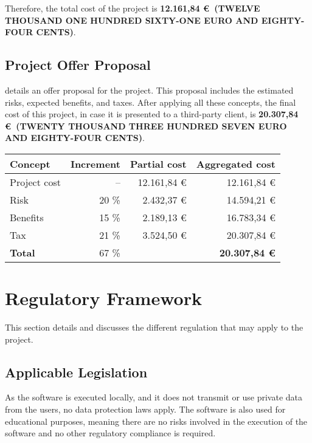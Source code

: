 Therefore, the total cost of the project is \textbf{12.161,84 \euro~(TWELVE THOUSAND ONE HUNDRED SIXTY-ONE EURO AND EIGHTY-FOUR CENTS)}.


\subsection{Project Offer Proposal}\label{subsec:offer-proposal}
 details an offer proposal for the project. This proposal includes the estimated risks, expected benefits, and taxes. After applying all these concepts, the final cost of this project, in case it is presented to a third-party client, is \textbf{20.307,84 \euro~(TWENTY THOUSAND THREE HUNDRED SEVEN EURO AND EIGHTY-FOUR CENTS)}.

\begin{table}[htb]
    {
      \begin{tabular}{lrrr}
        \toprule
        \textbf{Concept} & \textbf{Increment} & \textbf{Partial cost} & \textbf{Aggregated cost} \\
        \midrule
        Project cost   & --    & 12.161,84 \euro & 12.161,84 \euro \\
        Risk           & 20 \% &  2.432,37 \euro & 14.594,21 \euro \\
        Benefits       & 15 \% &  2.189,13 \euro & 16.783,34 \euro \\
        Tax            & 21 \% &  3.524,50 \euro & 20.307,84 \euro \\
        \midrule
        \textbf{Total} & 67 \% & & \textbf{20.307,84 \euro} \\
        \bottomrule
      \end{tabular}
    }
\end{table}



\section{Regulatory Framework}\label{sec:regulation}
This section details and discusses the different regulation that may apply to the project.

\subsection{Applicable Legislation}\label{subsec:legislation}
As the software is executed locally, and it does not transmit or use private data from the users, no data protection laws apply. The software is also used for educational purposes, meaning there are no risks involved in the execution of the software and no other regulatory compliance is required.


